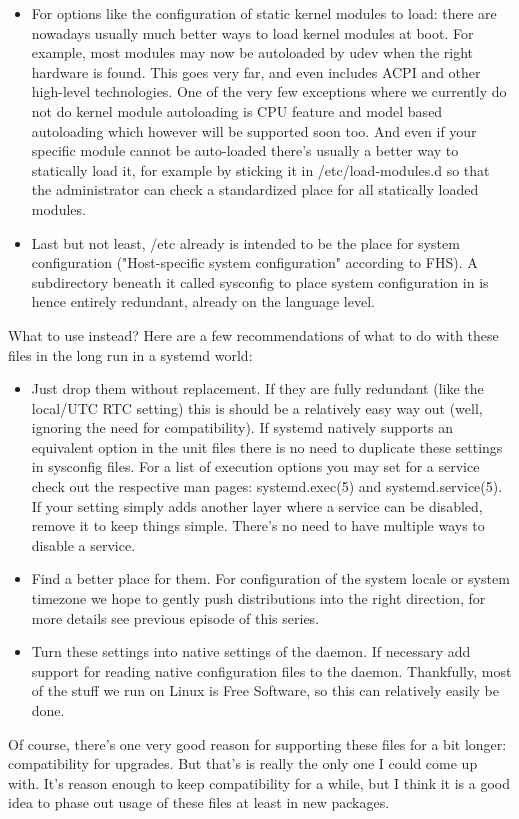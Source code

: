 \documentclass[titlepage]{article}
\begin{document}
\begin{itemize}
\item For options like the configuration of static kernel modules to load: there are nowadays usually much better ways to load kernel modules at boot. For example, most modules may now be autoloaded by udev when the right hardware is found. This goes very far, and even includes ACPI and other high-level technologies. One of the very few exceptions where we currently do not do kernel module autoloading is CPU feature and model based autoloading which however will be supported soon too. And even if your specific module cannot be auto-loaded there's usually a better way to statically load it, for example by sticking it in /etc/load-modules.d so that the administrator can check a standardized place for all statically loaded modules.
\item Last but not least, /etc already is intended to be the place for system configuration ("Host-specific system configuration" according to FHS). A subdirectory beneath it called sysconfig to place system configuration in is hence entirely redundant, already on the language level.
\end{itemize}
What to use instead? Here are a few recommendations of what to do with these files in the long run in a systemd world:
\begin{itemize}
\item Just drop them without replacement. If they are fully redundant (like the local/UTC RTC setting) this is should be a relatively easy way out (well, ignoring the need for compatibility). If systemd natively supports an equivalent option in the unit files there is no need to duplicate these settings in sysconfig files. For a list of execution options you may set for a service check out the respective man pages: systemd.exec(5) and systemd.service(5). If your setting simply adds another layer where a service can be disabled, remove it to keep things simple. There's no need to have multiple ways to disable a service.
\item Find a better place for them. For configuration of the system locale or system timezone we hope to gently push distributions into the right direction, for more details see previous episode of this series.
\item Turn these settings into native settings of the daemon. If necessary add support for reading native configuration files to the daemon. Thankfully, most of the stuff we run on Linux is Free Software, so this can relatively easily be done.
\end{itemize}
Of course, there's one very good reason for supporting these files for a bit longer: compatibility for upgrades. But that's is really the only one I could come up with. It's reason enough to keep compatibility for a while, but I think it is a good idea to phase out usage of these files at least in new packages.
\end{document}
